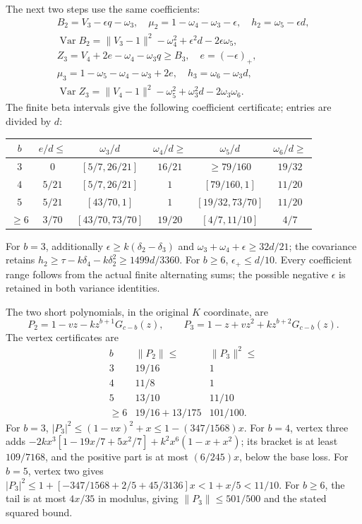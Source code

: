 The next two steps use the same coefficients:
\begin{gather*}
 B_2=V_3-\epsilon q-\omega_3,\quad
 \mu_2=1-\omega_4-\omega_3-\epsilon,\quad h_2=\omega_5-\epsilon d,\\
 \operatorname{Var}B_2=\|V_3-1\|^2-\omega_4^2+\epsilon^2d-2\epsilon\omega_5,\\
 Z_3=V_4+2e-\omega_4-\omega_3q\ge B_3,\quad e=(-\epsilon)_+,\\
 \mu_3=1-\omega_5-\omega_4-\omega_3+2e,\quad h_3=\omega_6-\omega_3d,\\
 \operatorname{Var}Z_3=\|V_4-1\|^2-\omega_5^2+\omega_3^2d-2\omega_3\omega_6.
\end{gather*}
The finite beta intervals give the following coefficient certificate;
entries are divided by $d$:
\begin{center}\small
\begin{tabular}{@{}cccccc@{}}\toprule
$b$&$e/d\le$&$\omega_3/d$&$\omega_4/d\ge$&$\omega_5/d$&$\omega_6/d\ge$\\\midrule
$3$&$0$&$[5/7,26/21]$&$16/21$&$\ge79/160$&$19/32$\\
$4$&$5/21$&$[5/7,26/21]$&$1$&$[79/160,1]$&$11/20$\\
$5$&$5/21$&$[43/70,1]$&$1$&$[19/32,73/70]$&$11/20$\\
$\ge6$&$3/70$&$[43/70,73/70]$&$19/20$&$[4/7,11/10]$&$4/7$\\\bottomrule
\end{tabular}
\end{center}
For $b=3$, additionally $\epsilon\ge k(\delta_{2}-\delta_{3})$ and
$\omega_3+\omega_4+\epsilon\ge32d/21$;
the covariance retains $h_2\ge\tau-k\delta_{4}-k\delta_{2}^2\ge1499d/3360$.
For $b\ge6$, $\epsilon_+\le d/10$.
Every coefficient range follows from the actual finite alternating sums;
the possible negative $\epsilon$ is retained in both variance identities.

The two short polynomials, in the original $K$ coordinate, are
\[
 P_2=1-vz-kz^{b+1}G_{c-b}(z),\qquad
 P_3=1-z+vz^2+kz^{b+2}G_{c-b}(z).
\]
The vertex certificates are
\[
 \begin{array}{c|cc}
 b&\|P_2\|\le&\|P_3\|^2\le\\\hline
 3&19/16&1\\4&11/8&1\\5&13/10&11/10\\
 \ge6&19/16+13/175&101/100.
 \end{array}
\]
For $b=3$, $|P_3|^2\le(1-vx)^2+x\le1-(347/1568)x$.
For $b=4$, vertex three adds
$-2kx^3[1-19x/7+5x^2/7]+k^2x^6(1-x+x^2)$;
its bracket is at least $109/7168$, and the positive part is at most
$(6/245)x$, below the base loss.
For $b=5$, vertex two gives
$|P_3|^2\le1+[-347/1568+2/5+45/3136]x<1+x/5<11/10$.
For $b\ge6$, the tail is at most $4x/35$ in modulus, giving
$\|P_3\|\le501/500$ and the stated squared bound.

